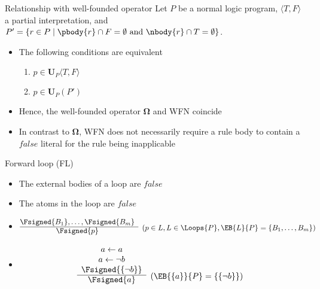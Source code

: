 \begin{frame}{Relationship with well-founded operator}
\bigskip
Let $P$ be a normal logic program,
$\langle T,F \rangle$ a partial interpretation, and\\
$P'=\{r\in P \mid \pbody{r}\cap F=\emptyset \text{ and } \nbody{r}\cap T=\emptyset\}$.\\
\bigskip
\begin{itemize}
\item <2-> The following conditions are equivalent
  \begin{enumerate}
  \item $p\in\mathbf{U}_P\langle T,F \rangle$
  \item $p\in\mathbf{U}_P(P')$
  \end{enumerate}
  \medskip
\item<3-> Hence, the well-founded operator $\mathbf{\Omega}$ and WFN coincide
\item<4->  In contrast to $\mathbf{\Omega}$, WFN does not necessarily require a rule
  body to contain a $\mathit{false}$ literal for the rule being inapplicable
\end{itemize}
\end{frame}
\begin{frame}{Forward loop (FL)}

\begin{itemize}
\item {} The external bodies of a loop are $\mathit{false}$
\item {} The atoms in the loop are $\mathit{false}$
\item {}
\[
\begin{array}{@{}cl}
\Fsigned{B_1},\dots,\Fsigned{B_m} &
\raisebox{-8pt}[0pt][0pt]{($p \in L, L \in \Loops{P}, \EB{L}{P}=\{B_1,\dots,B_m\}$)}
\\\cline{1-1}
\Fsigned{p}
\end{array}
\]
\item<2-> 
\[
\begin{array}{cl}
a \leftarrow a \\
a \leftarrow \neg b \\
\Fsigned{\{\neg b\}} &
\raisebox{-8pt}[0pt][0pt]{($\EB{\{a\}}{P}=\{\{\neg b\}\}$)}
\\\cline{1-1}
\Fsigned{a}
\end{array}
\]
\end{itemize}
\end{frame}
